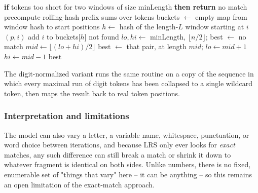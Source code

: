 \documentclass{article}
\begin{document}
\begin{algorithm}[h]
\caption{Longest Repeated Substring}
\begin{algorithmic}[1]
    \State \textbf{if} tokens too short for two windows of size minLength \textbf{then return} no match
    \State precompute rolling-hash prefix sums over tokens 
        \State buckets $\gets$ empty map from window hash to start positions
            \State $h \gets$ hash of the length-$L$ window starting at $i$ 
                    \State \Return $(p, i)$ 
                \EndIf
            \EndFor
            \State add $i$ to buckets[$h$]
        \EndFor
        \State \Return not found
    \EndFunction
    \State $lo, hi \gets$ minLength, $\lfloor n/2 \rfloor$; best $\gets$ no match
        \State $mid \gets \lfloor (lo+hi)/2 \rfloor$
            \State best $\gets$ that pair, at length $mid$; $lo \gets mid+1$ 
        \Else
            \State $hi \gets mid-1$ 
        \EndIf
    \EndWhile
    \State \Return best
\EndFunction
\end{algorithmic}
\end{algorithm}

The digit-normalized variant runs the same routine on a copy of the
sequence in which every maximal run of digit tokens has been collapsed to a
single wildcard token, then maps the result back to real token positions.

\subsubsection{Interpretation and limitations}
\label{sec:lrs-tolerance}

The model can also vary a letter, a variable name, whitespace, punctuation,
or word choice between iterations, and because LRS only ever looks for
\emph{exact} matches, any such difference can still break a match or shrink
it down to whatever fragment is identical on both sides. Unlike numbers,
there is no fixed, enumerable set of "things that vary" here -- it can be
anything -- so this remains an open limitation of the exact-match approach.
\end{document}
